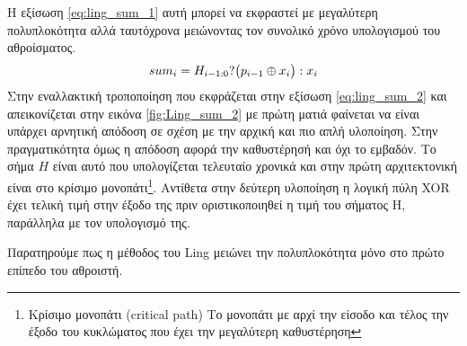 Η εξίσωση \ref{eq:ling_sum_1} αυτή μπορεί να εκφραστεί με μεγαλύτερη πολυπλοκότητα 
αλλά ταυτόχρονα μειώνοντας τον συνολικό χρόνο υπολογισμού του αθροίσματος.
\begin{equation}
\label{eq:ling_sum_2}
\equationame{άθροισμα κατά Ling (2)}
    sum_i = H_{i-1:0} ? \big(p_{i-1} \oplus x_i\big) : x_i
\end{equation}
Στην εναλλακτική τροποποίηση που εκφράζεται στην εξίσωση \ref{eq:ling_sum_2} και 
απεικονίζεται στην εικόνα \ref{fig:Ling_sum_2} με πρώτη ματιά φαίνεται να είναι 
υπάρχει αρνητική απόδοση σε σχέση με την αρχική και πιο απλή υλοποίηση.
Στην πραγματικότητα όμως η απόδοση αφορά την καθυστέρησή και όχι το εμβαδόν. Το σήμα
$Η$ είναι αυτό που υπολογίζεται τελευταίο χρονικά και στην πρώτη αρχιτεκτονική
είναι στο κρίσιμο μονοπάτι\footnote{Κρίσιμο μονοπάτι (critical path) Το μονοπάτι με αρχί την είσοδο και τέλος την έξοδο του κυκλώματος που έχει την μεγαλύτερη καθυστέρηση}. Αντίθετα στην δεύτερη υλοποίηση η λογική πύλη XOR 
έχει τελική τιμή στην έξοδο της πριν οριστικοποιηθεί η τιμή του σήματος H, παράλληλα 
με τον υπολογισμό της. 

 Παρατηρούμε πως η μέθοδος του Ling μειώνει την πολυπλοκότητα μόνο στο πρώτο επίπεδο 
 του αθροιστή.
 
 
 
 
 
 
 
 
